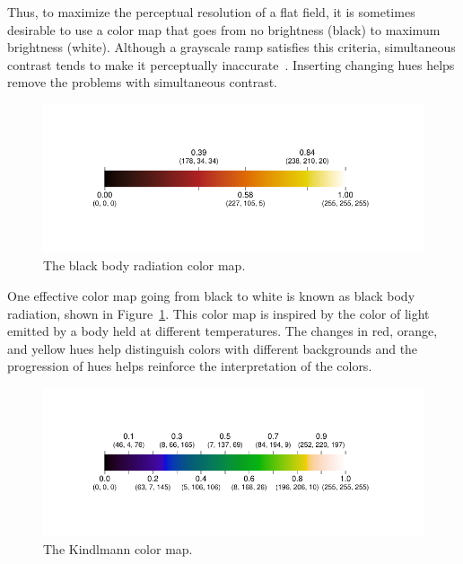 \documentclass[letterpaper,twocolumn,fleqn]{article}
\newcommand*{\lcite}[1]{~\cite{#1}}
\begin{document}
Thus, to maximize the perceptual resolution of a flat field, it is
sometimes desirable to use a color map that goes from no brightness (black)
to maximum brightness (white). Although a grayscale ramp satisfies this
criteria, simultaneous contrast tends to make it perceptually
inaccurate\lcite{Ware2004}. Inserting changing hues helps remove the
problems with simultaneous contrast.

\begin{figure}[htb]
  \centering
  \includegraphics[width=\linewidth,trim=0.69in 0.62in 0.76in 0.62in]
                  {ipython/BlackBodyMap}
  \caption{The black body radiation color map.}
  \label{fig:BlackBodyRadiationColorBar}
\end{figure}

One effective color map going from black to white is known as black
body radiation, shown in Figure~\ref{fig:BlackBodyRadiationColorBar}. This
color map is inspired by the color of light emitted by a body held at
different temperatures. The changes in red, orange, and yellow hues help
distinguish colors with different backgrounds and the progression of hues
helps reinforce the interpretation of the colors.

\begin{figure}[htb]
  \centering
  \includegraphics[width=\linewidth,trim=0.69in 0.62in 0.76in 0.62in]
                  {ipython/KindlmannMap}
  \caption{The Kindlmann color map.}
  \label{fig:KindlmannColorBar}
\end{figure}
\end{document}
